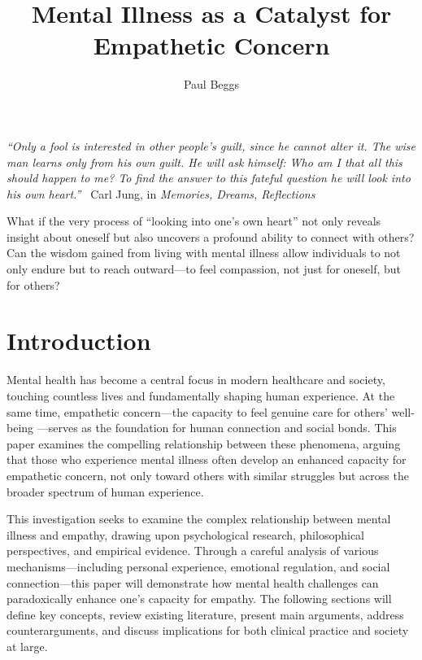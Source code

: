 \documentclass[stu]{apa7}
\title{Mental Illness as a Catalyst for Empathetic Concern}
\author{Paul Beggs}
\begin{document}
\maketitle

\textit{``Only a fool is interested in other people's guilt, since he cannot alter it. The wise man learns only from his own guilt. He will ask himself: Who am I that all this should happen to me? To find the answer to this fateful question he will look into his own heart.''} \textendash\ Carl Jung, in \textit{Memories, Dreams, Reflections}

What if the very process of ``looking into one's own heart'' not only reveals insight about oneself but also uncovers a profound ability to connect with others? Can the wisdom gained from living with mental illness allow individuals to not only endure but to reach outward—to feel compassion, not just for oneself, but for others?

\section{Introduction}

Mental health has become a central focus in modern healthcare and society, touching countless lives and fundamentally shaping human experience. At the same time, empathetic concern—the capacity to feel genuine care for others' well-being \parencite[adapted from][]{batson_empathyaltruism_2015}—serves as the foundation for human connection and social bonds. This paper examines the compelling relationship between these phenomena, arguing that those who experience mental illness often develop an enhanced capacity for empathetic concern, not only toward others with similar struggles but across the broader spectrum of human experience.

This investigation seeks to examine the complex relationship between mental illness and empathy, drawing upon psychological research, philosophical perspectives, and empirical evidence. Through a careful analysis of various mechanisms—including personal experience, emotional regulation, and social connection—this paper will demonstrate how mental health challenges can paradoxically enhance one's capacity for empathy. The following sections will define key concepts, review existing literature, present main arguments, address counterarguments, and discuss implications for both clinical practice and society at large.

\end{document}
